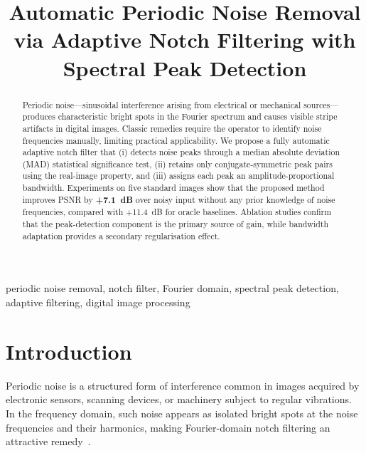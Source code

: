 \documentclass[conference,a4paper]{IEEEtran}
\begin{document}
\title{Automatic Periodic Noise Removal via Adaptive Notch Filtering with Spectral Peak Detection}

\author{
}

\maketitle

\begin{abstract}
Periodic noise—sinusoidal interference arising from electrical or mechanical sources—produces characteristic bright spots in the Fourier spectrum and causes visible stripe artifacts in digital images. Classic remedies require the operator to identify noise frequencies manually, limiting practical applicability. We propose a fully automatic adaptive notch filter that (i) detects noise peaks through a median absolute deviation (MAD) statistical significance test, (ii) retains only conjugate-symmetric peak pairs using the real-image property, and (iii) assigns each peak an amplitude-proportional bandwidth. Experiments on five standard images show that the proposed method improves PSNR by \textbf{+7.1~dB} over noisy input without any prior knowledge of noise frequencies, compared with +11.4~dB for oracle baselines. Ablation studies confirm that the peak-detection component is the primary source of gain, while bandwidth adaptation provides a secondary regularisation effect.
\end{abstract}

\begin{IEEEkeywords}
periodic noise removal, notch filter, Fourier domain, spectral peak detection, adaptive filtering, digital image processing
\end{IEEEkeywords}

\section{Introduction}
\label{sec:intro}

Periodic noise is a structured form of interference common in images acquired by electronic sensors, scanning devices, or machinery subject to regular vibrations. In the frequency domain, such noise appears as isolated bright spots at the noise frequencies and their harmonics, making Fourier-domain notch filtering an attractive remedy~\cite{gonzalez2018}.
\end{document}
